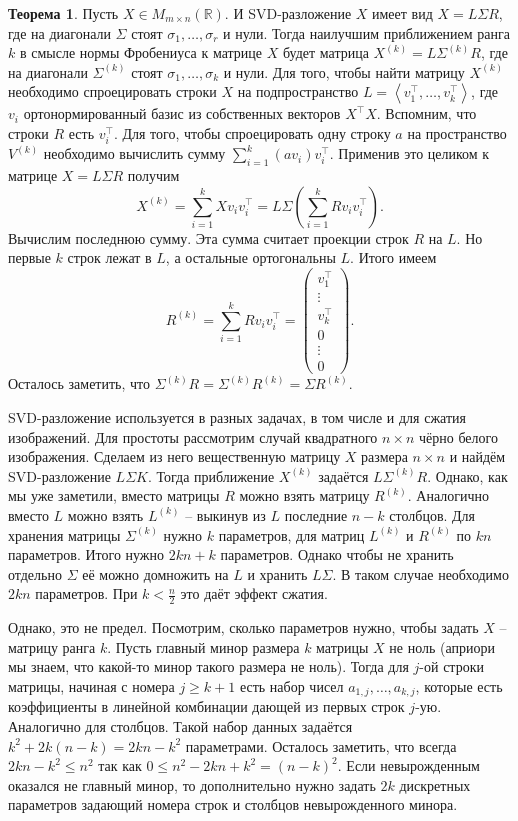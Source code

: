 \documentclass[10pt,a4paper,oneside]{book}
\theoremstyle{definition}
\newtheorem{thm}{{\color{red!40!black} Теорема}}
\newcommand{\mb}[1]{\mathbb{#1}}
\def\lan{\left\langle }
\def\ran{\right\rangle}
\def\thrm{\begin{thm}}
\def\ethrm{\end{thm}}
\def\pmat{\begin{pmatrix}}
\def\epmat{\end{pmatrix}}
\begin{document}
\thrm Пусть $X\in M_{m\times n}(\mb R)$. И SVD-разложение $X$ имеет вид $X=L\Sigma R$, где на диагонали $\Sigma$ стоят $\sigma_1,\dots,\sigma_r$ и нули. Тогда наилучшим приближением ранга $k$ в смысле нормы Фробениуса к матрице $X$ будет матрица $X^{(k)}=L\Sigma^{(k)}R$, где на диагонали $\Sigma^{(k)}$ стоят $\sigma_1,\dots,\sigma_{k}$ и нули.
\proof Для того, чтобы найти матрицу $X^{(k)}$ необходимо спроецировать строки $X$ на подпространство $L=\lan v_1^{\top},\dots,v_k^{\top}\ran$, где $v_i$ ортонормированный базис из собственных векторов $X^{\top}X$.  Вспомним, что строки $R$ есть $v_i^{\top}$. Для того, чтобы спроецировать одну строку $a$ на пространство $V^{(k)}$ необходимо вычислить сумму $\sum_{i=1}^k (av_i)v_i^{\top}$. Применив это целиком к матрице $X=L\Sigma R$ получим 
$$X^{(k)}=\sum_{i=1}^k Xv_iv_i^{\top}=L\Sigma \left(\sum_{i=1}^k Rv_iv_i^{\top}\right).$$
Вычислим последнюю сумму. Эта сумма считает проекции строк $R$ на $L$. Но первые $k$ строк лежат в $L$, а остальные ортогональны $L$. Итого имеем
$$R^{(k)}=\sum_{i=1}^k Rv_iv_i^{\top} = \pmat v_1^{\top} \\ \vdots \\ v_k^{\top} \\ 0 \\ \vdots \\ 0 \epmat.$$
Осталось заметить, что $\Sigma^{(k)} R= \Sigma^{(k)}R^{(k)}=\Sigma R^{(k)}$.
\endproof
\ethrm 

SVD-разложение используется в разных задачах, в том числе и для сжатия изображений.  Для простоты рассмотрим случай квадратного $n \times n$ чёрно белого изображения. Сделаем из него вещественную матрицу $X$ размера $n \times n$ и найдём SVD-разложение $L \Sigma K$. Тогда приближение $X^{(k)}$ задаётся $L\Sigma^{(k)}R$. Однако, как мы уже заметили, вместо матрицы $R$ можно взять матрицу $R^{(k)}$. Аналогично вместо $L$ можно взять $L^{(k)}$ -- выкинув из $L$ последние $n-k$ столбцов. Для хранения матрицы $\Sigma^{(k)}$ нужно $k$ параметров, для матриц $L^{(k)}$ и $R^{(k)}$ по $kn$ параметров. Итого нужно $2kn+k$ параметров. Однако чтобы не хранить отдельно $\Sigma$ её можно домножить на $L$ и хранить $L\Sigma$. В таком случае необходимо $2kn$ параметров. При $k<\frac{n}{2}$ это даёт эффект сжатия. 

Однако, это не предел. Посмотрим, сколько параметров нужно, чтобы задать $X$ -- матрицу ранга $k$. Пусть главный минор размера $k$ матрицы $X$ не ноль (априори мы знаем, что какой-то минор такого размера не ноль). Тогда для $j$-ой строки матрицы, начиная с номера $j \geq k+1$ есть набор чисел $a_{1,j},\dots,a_{k,j}$, которые есть коэффициенты в линейной комбинации дающей из первых строк $j$-ую. Аналогично для столбцов. Такой набор данных задаётся $k^2+ 2k(n-k)=2kn-k^2$ параметрами. Осталось заметить, что всегда $2kn - k^2\leq n^2$ так как $0\leq n^2-2kn+k^2=(n-k)^2$. Если невырожденным оказался не главный минор, то дополнительно нужно задать $2k$ дискретных параметров задающий номера строк и столбцов невырожденного минора.
\end{document}
